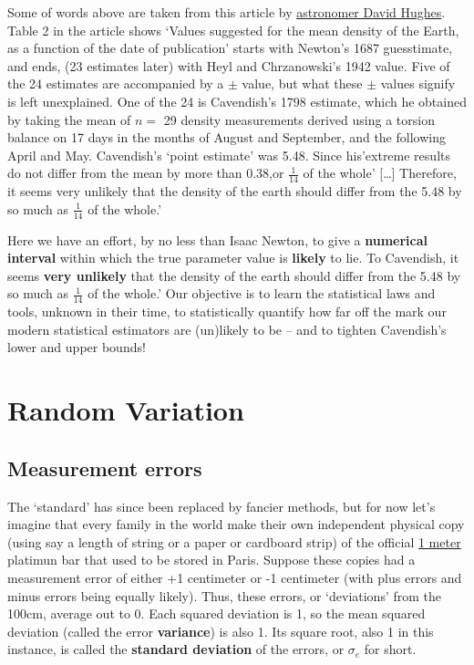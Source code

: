 \documentclass[]{book}
\begin{document}
Some of words above are taken from this article by \href{http://www.biostat.mcgill.ca/hanley/statbook/DensityOfEarth.pdf}{astronomer David Hughes}.
Table 2 in the article shows `Values suggested for the mean density of the Earth, as a function of the date of publication' starts with Newton's 1687 guesstimate, and ends, (23 estimates later) with Heyl and Chrzanowski's 1942 value.
Five of the 24 estimates are accompanied by a \(\pm\) value, but what these \(\pm\) values signify is left unexplained. One of the 24 is Cavendish's 1798 estimate, which he obtained by taking the mean of \(n =\) 29 density measurements derived using a torsion balance on 17 days in the months of August and September, and the following April and May. Cavendish's `point estimate' was 5.48. Since his'extreme results do not differ from the mean by more than 0.38,or \(\frac{1}{14}\) of the whole' {[}\ldots{}{]} Therefore, it seems very unlikely that the density of the earth should differ from the 5.48 by so much as \(\frac{1}{14}\) of the whole.'

Here we have an effort, by no less than Isaac Newton, to give a \textbf{numerical interval} within which the true parameter value is \textbf{likely} to lie. To Cavendish, it seems \textbf{very unlikely} that the density of the earth should differ from the 5.48 by so much as \(\frac{1}{14}\) of the whole.' Our objective is to learn the statistical laws and tools, unknown in their time, to statistically quantify how far off the mark our modern statistical estimators are (un)likely to be -- and to tighten Cavendish's lower and upper bounds!

\hypertarget{random-variation}{%
\section{Random Variation}\label{random-variation}}

\hypertarget{measurement-errors}{%
\subsection{Measurement errors}\label{measurement-errors}}

The `standard' has since been replaced by fancier methods, but for now let's imagine that every family in the world make their own independent physical copy (using say a length of string or a paper or cardboard strip) of the official \href{https://en.wikipedia.org/wiki/History_of_the_metre}{1 meter} platimun bar that used to be stored in Paris. Suppose these copies had a measurement error of either +1 centimeter or -1 centimeter (with plus errors and minus errors being equally likely). Thus, these errors, or `deviations' from the 100cm, average out to 0. Each squared deviation is 1, so the mean squared deviation (called the error \textbf{variance}) is also 1. Its square root, also 1 in this instance, is called the \textbf{standard deviation} of the errors, or \(\sigma_{e}\) for short.
\end{document}
